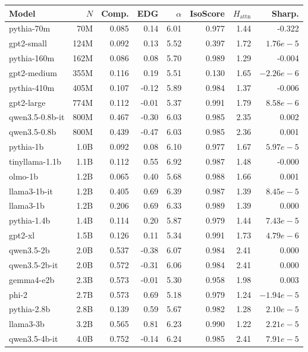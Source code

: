 \begin{tabular}{@{}lrrrrrrr@{}}
\toprule
\textbf{Model} & $N$ & \textbf{Comp.} & \textbf{EDG} & $\alpha$ & \textbf{IsoScore} & $H_{\text{attn}}$ & \textbf{Sharp.}\\
\midrule
pythia-70m & 70M & 0.085 & 0.14 & 6.01 & 0.977 & 1.44 & -0.322 \\
gpt2-small & 124M & 0.092 & 0.13 & 5.52 & 0.397 & 1.72 & $1.76e-5$ \\
pythia-160m & 162M & 0.086 & 0.08 & 5.70 & 0.989 & 1.29 & -0.004 \\
gpt2-medium & 355M & 0.116 & 0.19 & 5.51 & 0.130 & 1.65 & $-2.26e-6$ \\
pythia-410m & 405M & 0.107 & -0.12 & 5.89 & 0.984 & 1.37 & -0.006 \\
gpt2-large & 774M & 0.112 & -0.01 & 5.37 & 0.991 & 1.79 & $8.58e-6$ \\
qwen3.5-0.8b-it & 800M & 0.467 & -0.30 & 6.03 & 0.985 & 2.35 & 0.002 \\
qwen3.5-0.8b & 800M & 0.439 & -0.47 & 6.03 & 0.985 & 2.36 & 0.001 \\
pythia-1b & 1.0B & 0.092 & 0.08 & 6.10 & 0.977 & 1.67 & $5.97e-5$ \\
tinyllama-1.1b & 1.1B & 0.112 & 0.55 & 6.92 & 0.987 & 1.48 & -0.000 \\
olmo-1b & 1.2B & 0.065 & 0.40 & 5.68 & 0.988 & 1.66 & 0.001 \\
llama3-1b-it & 1.2B & 0.405 & 0.69 & 6.39 & 0.987 & 1.39 & $8.45e-5$ \\
llama3-1b & 1.2B & 0.206 & 0.69 & 6.33 & 0.989 & 1.39 & 0.000 \\
pythia-1.4b & 1.4B & 0.114 & 0.20 & 5.87 & 0.979 & 1.44 & $7.43e-5$ \\
gpt2-xl & 1.5B & 0.126 & 0.11 & 5.34 & 0.991 & 1.73 & $4.79e-6$ \\
qwen3.5-2b & 2.0B & 0.537 & -0.38 & 6.07 & 0.984 & 2.41 & 0.000 \\
qwen3.5-2b-it & 2.0B & 0.572 & -0.31 & 6.06 & 0.984 & 2.41 & 0.000 \\
gemma4-e2b & 2.3B & 0.573 & -0.01 & 5.30 & 0.958 & 1.98 & 0.003 \\
phi-2 & 2.7B & 0.573 & 0.69 & 5.18 & 0.979 & 1.24 & $-1.94e-5$ \\
pythia-2.8b & 2.8B & 0.139 & 0.59 & 5.67 & 0.982 & 1.28 & $2.10e-5$ \\
llama3-3b & 3.2B & 0.565 & 0.81 & 6.23 & 0.990 & 1.22 & $2.21e-5$ \\
qwen3.5-4b-it & 4.0B & 0.752 & -0.14 & 6.24 & 0.985 & 2.41 & $7.91e-5$ \\

\end{tabular}
